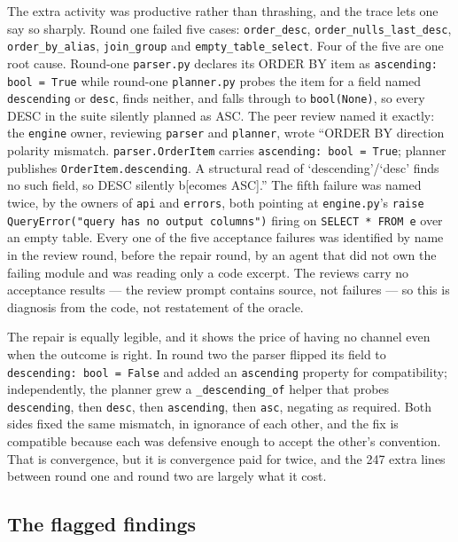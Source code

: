\documentclass[11pt]{article}
\begin{document}
The extra activity was productive rather than thrashing, and the trace lets one say so sharply.
Round one failed five cases: \texttt{order\_desc}, \texttt{order\_nulls\_last\_desc},
\texttt{order\_by\_alias}, \texttt{join\_group} and \texttt{empty\_table\_select}. Four of the
five are one root cause. Round-one \texttt{parser.py} declares its ORDER BY item as
\texttt{ascending: bool = True} while round-one \texttt{planner.py} probes the item for a field
named \texttt{descending} or \texttt{desc}, finds neither, and falls through to
\texttt{bool(None)}, so every DESC in the suite silently planned as ASC. The peer review named it
exactly: the \texttt{engine} owner, reviewing \texttt{parser} and \texttt{planner}, wrote ``ORDER
BY direction polarity mismatch. \texttt{parser.OrderItem} carries \texttt{ascending: bool = True};
planner publishes \texttt{OrderItem.descending}. A structural read of `descending'/`desc' finds no
such field, so DESC silently b[ecomes ASC].'' The fifth failure was named twice, by the owners of
\texttt{api} and \texttt{errors}, both pointing at \texttt{engine.py}'s
\texttt{raise QueryError("query has no output columns")} firing on \texttt{SELECT * FROM e} over
an empty table. Every one of the five acceptance failures was identified by name in the review
round, before the repair round, by an agent that did not own the failing module and was reading
only a code excerpt. The reviews carry no acceptance results --- the review prompt contains
source, not failures --- so this is diagnosis from the code, not restatement of the oracle.

The repair is equally legible, and it shows the price of having no channel even when the outcome
is right. In round two the parser flipped its field to \texttt{descending: bool = False} and added
an \texttt{ascending} property for compatibility; independently, the planner grew a
\texttt{\_descending\_of} helper that probes \texttt{descending}, then \texttt{desc}, then
\texttt{ascending}, then \texttt{asc}, negating as required. Both sides fixed the same mismatch,
in ignorance of each other, and the fix is compatible because each was defensive enough to accept
the other's convention. That is convergence, but it is convergence paid for twice, and the 247
extra lines between round one and round two are largely what it cost.

\subsection{The flagged findings}
\end{document}
